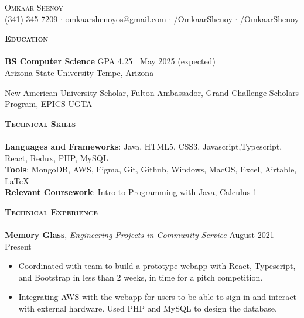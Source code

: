\documentclass[a4paper]{article}
\newcommand{\lineunder} {
    \vspace*{-8pt} \\
    \hspace*{-18pt} \hrulefill \\
}
\newcommand{\header} [1] {
    {\hspace*{-15pt}\vspace*{3pt} \textsc{#1}}
    \vspace*{-6pt} \lineunder
}
\begin{document}
\vspace*{-30.9pt}



{\begin{center}
	{\Huge \scshape {Omkaar Shenoy}}\\
	\vspace{2mm}
	\faPhone  \hspace{0.5mm} (341)-345-7209 $\cdot$ \href{mailto:omkaarshenoyos@gmail.com}{\faEnvelope \hspace{0.5mm} omkaarshenoyos@gmail.com} \hspace{0.5mm}   $\cdot$ \href{https://www.linkedin.com/in/OmkaarShenoy/}{\faLinkedin/OmkaarShenoy} $\cdot$ \href{https://github.com/OmkaarShenoy}{\faGithub/OmkaarShenoy}
	
\end{center}


    \header{\textbf{Education}}

    \textbf{BS Computer Science} \hfill GPA 4.25 | May 2025 (expected)
\\ Arizona State University \hfill Tempe, Arizona
 
New American University Scholar, Fulton Ambassador, Grand Challenge Scholars Program, EPICS UGTA\\


\vspace{1mm}

\header{\textbf{Technical Skills}}

\textbf{Languages and Frameworks}: Java, HTML5, CSS3, Javascript,Typescript, React, Redux, PHP, MySQL \\
\textbf{Tools}: MongoDB, AWS, Figma, Git, Github, Windows, MacOS, Excel, Airtable, \LaTeX \\
\textbf{Relevant Coursework}: Intro to Programming with Java, Calculus 1 \\
\vspace{1mm}


\header{\textbf{Technical Experience}}
\textbf{Memory Glass},  \href{https://epics.engineering.asu.edu/}{\textit{Engineering Projects in Community Service}} \faExternalLink
\hfill August 2021 - Present\\
\vspace{-3mm}
\begin{itemize}
    \item Coordinated with team to build a prototype webapp with React, Typescript, and Bootstrap in less than 2 weeks, in time for a pitch competition. 
    \item Integrating AWS with the webapp for users to be able to sign in and interact with external hardware. Used PHP and MySQL to design the database. 
    

\end{itemize}}
\end{document}
